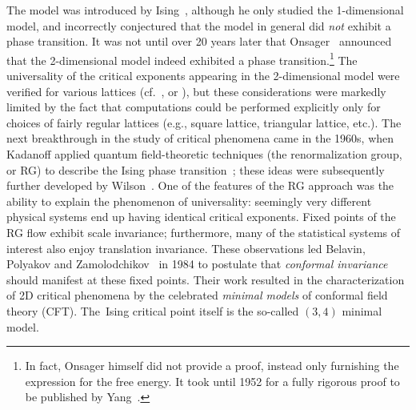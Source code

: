 \documentclass[10pt,a4paper]{amsart}
\numberwithin{equation}{section}
\begin{document}
The model was introduced by Ising~\cite{Ising}, although he only studied the 1-dimensional model, and incorrectly
conjectured that the model in general did \textit{not} exhibit a phase transition. It was not until over 20 years later that Onsager~\cite{Onsager} announced that the
2-dimensional model indeed exhibited a phase transition.\footnote{In fact, Onsager himself did not provide a proof, instead only furnishing the expression for the free energy. It took until 1952 for a fully rigorous proof to be published by Yang~\cite{Yang}.} The universality of the critical exponents appearing in the 2-dimensional model were verified
for various lattices (cf.~\cite{MW}, or \cite[Chapter~11 and references therein]{Baxter}), but these considerations were markedly limited by the fact that computations could be performed explicitly only
for choices of fairly regular lattices (e.g., square lattice, triangular lattice, etc.). The next breakthrough in the study of critical phenomena came in the 1960s, when Kadanoff applied quantum field-theoretic techniques (the renormalization group, or RG) to describe the Ising phase transition~\cite{Kadanoff}; these ideas were subsequently further developed by Wilson~\cite{Wilson1,Wilson2}.
One of the features of the RG approach was the ability to explain the phenomenon of universality: seemingly very different physical systems end up having identical critical exponents. Fixed points of the RG flow exhibit scale invariance; furthermore, many of the statistical systems of interest also enjoy translation invariance. These observations led Belavin, Polyakov and Zamolodchikov~\cite{BPZ} in 1984 to postulate that \textit{conformal invariance} should manifest at these fixed points. Their work resulted in the characterization of 2D critical phenomena by the celebrated \textit{minimal models} of conformal field theory (CFT). The~Ising critical point itself is the so-called $(3,4)$ minimal model.
\end{document}
